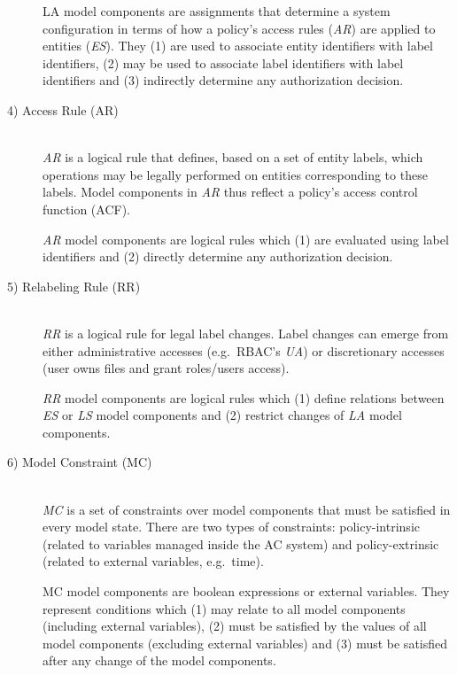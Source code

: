 \documentclass[twoside, openright, 12pt]{book}
\begin{document}
\begin{description}
\begin{xdefinition}[LA] 
LA model components are assignments that determine a system configuration in terms of how a policy's access rules (\textit{AR}) are applied to entities (\textit{ES}). They (1) are used to associate entity identifiers with label identifiers, (2) may be used to associate label identifiers with label identifiers and (3) indirectly determine any authorization decision.
\label{definition:LA}
\end{xdefinition}



\item[4) Access Rule (AR)]\hfill \\
\textit{AR} is a logical rule that defines, based on a set of entity labels, which operations may be legally performed on entities corresponding to these labels. Model components in \textit{AR} thus reflect a policy’s access control function (ACF).
\vspace{-2mm}

\begin{xdefinition}[AR] 
\textit{AR} model components are logical rules which (1) are evaluated using label identifiers and (2) directly determine any authorization decision.
\label{definition:AR}
\end{xdefinition}



\item[5) Relabeling Rule (RR)]\hfill \\
\textit{RR} is a logical rule for legal label changes.
Label changes can emerge from either administrative accesses (e.g.~RBAC's \textit{UA}) or discretionary accesses (user owns files and grant roles/users access).
\vspace{-2mm}

\begin{xdefinition}[RR] 
\textit{RR} model components are logical rules which (1) define relations between \textit{ES} or \textit{LS} model components and (2) restrict changes of \textit{LA} model components.
\label{definition:RR}
\end{xdefinition}



\item[6) Model Constraint (MC)]\hfill \\
\textit{MC} is a set of constraints over model components that must be satisfied in every model state.
There are two types of constraints: policy-intrinsic (related to variables managed inside the AC system) and policy-extrinsic (related to external variables, e.g.~time).
\vspace{-2mm}

\begin{xdefinition}[MC] 
MC model components are boolean expressions or external variables. 
They represent conditions which (1) may relate to all model components (including external variables), (2) must be satisfied by the values of all model components (excluding external variables) and (3) must be satisfied after any change of the model components.
\label{definition:MC}
\end{xdefinition}
\end{description}
\end{document}
